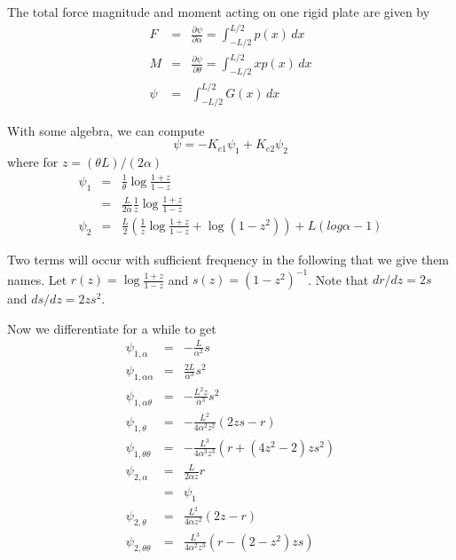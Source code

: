 The total force magnitude and moment acting on one rigid plate
are given by
\begin{eqnarray*}
  F & = & \frac{\partial \psi}{\partial \alpha} 
          = \int_{-L/2}^{L/2} p(x) \, dx \\
  M & = & \frac{\partial \psi}{\partial \theta}
          = \int_{-L/2}^{L/2} x p(x) \, dx \\
  \psi & = & \int_{-L/2}^{L/2} G(x) \, dx
\end{eqnarray*}

With some algebra, we can compute
\[
  \psi = -K_{e1} \psi_1 + K_{e2} \psi_2
\]
where for $z = (\theta L)/(2 \alpha)$
\begin{eqnarray*}
  \psi_1 & = & \frac{1}{\theta} \log \frac{1+z}{1-z} \\
         & = & \frac{L}{2\alpha} \frac{1}{z} \log \frac{1+z}{1-z} \\
  \psi_2 & = & \frac{L}{2} \left(
                 \frac{1}{z} \log \frac{1+z}{1-z} +
                 \log (1-z^2) 
               \right) + L (log \alpha - 1)
\end{eqnarray*}

Two terms will occur with sufficient frequency in the following
that we give them names.  Let $r(z) = \log \frac{1+z}{1-z}$ and 
$s(z) = (1-z^2)^{-1}$.  Note that $dr/dz = 2s$ and $ds/dz = 2z s^2$.

Now we differentiate for a while to get
\begin{eqnarray*}
  \psi_{1,\alpha} 
    & = & -\frac{L}{\alpha^2} s 
\\
  \psi_{1,\alpha \alpha} 
    & = & \frac{2L}{\alpha^3} s^2
\\
  \psi_{1,\alpha \theta}
    & = & -\frac{L^2 z}{\alpha^3} s^2
\\
  \psi_{1,\theta}
    & = & -\frac{L^2}{4 \alpha^2 z^2} (2zs - r)
\\
  \psi_{1,\theta \theta}
    & = & -\frac{L^3}{4 \alpha^3 z^3} (r + (4z^2-2)z s^2)
\\
  \psi_{2,\alpha}
    & = & \frac{L}{2 \alpha z} r \\
    & = & \psi_1
\\
  \psi_{2,\theta}
    & = & \frac{L^2}{4 \alpha z^2} (2z - r)
\\
  \psi_{2,\theta \theta}
    & = & \frac{L^3}{4 \alpha^2 z^3} (r - (2-z^2)z s)
\end{eqnarray*}

